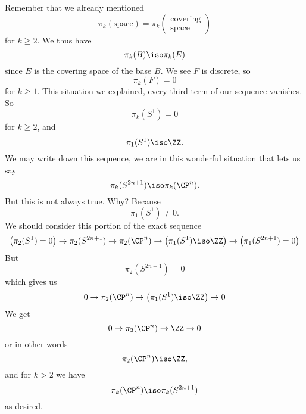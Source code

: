 Remember that we already mentioned
\begin{equation}
\pi_{k}(\mbox{space})=\pi_{k}\begin{pmatrix}\mbox{covering}\\\mbox{space}
\end{pmatrix}
\end{equation}
for $k\geq2$. We thus have
\begin{equation}
\pi_{k}(B)\iso\pi_{k}(E)
\end{equation}
since $E$ is the covering space of the base $B$. We see $F$ is
discrete, so 
\begin{equation}
\pi_{k}(F)=0
\end{equation}
for $k\geq1$. This situation we explained, every third term of
our sequence vanishes. So
\begin{equation}
\pi_{k}(S^1)=0
\end{equation}
for $k\geq2$, and
\begin{equation}
\pi_{1}(S^1)\iso\ZZ.
\end{equation}
We may write down this sequence, we are in this wonderful
situation that lets us say
\begin{equation}
\pi_{k}(S^{2n+1})\iso\pi_{k}(\CP^n).
\end{equation}
But this is not always true. Why? Because
\begin{equation}
\pi_{1}(S^{1})\not=0.
\end{equation}
We should consider this portion of the exact sequence
\begin{equation}
\bigl(\pi_{2}(S^{1})=0\bigr)\to
\pi_{2}(S^{2n+1})\to
\pi_{2}(\CP^n)\to
\bigl(\pi_{1}(S^{1})\iso\ZZ\bigr)\to
\bigl(\pi_{1}(S^{2n+1})=0\bigr)
\end{equation}
But
\begin{equation}
\pi_{2}(S^{2n+1})=0
\end{equation}
which gives us
\begin{equation}
0\to\pi_{2}(\CP^n)\to\bigl(\pi_{1}(S^{1})\iso\ZZ\bigr)\to0
\end{equation}
We get
\begin{equation}
0\to\pi_{2}(\CP^n)\to\ZZ\to0
\end{equation}
or in other words
\begin{equation}
\pi_{2}(\CP^n)\iso\ZZ,
\end{equation}
and for $k>2$ we have
\begin{equation}
\pi_{k}(\CP^{n})\iso\pi_{k}(S^{2n+1})
\end{equation}
as desired.
